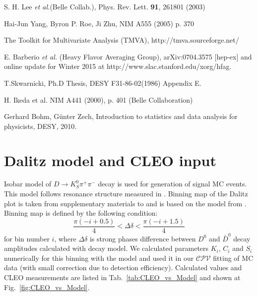 \documentclass[preprint,aps,showpacs]{revtex4}
\newcommand{\cpvconj}{\ensuremath{\mathcal{CPV}}\xspace}
\newcommand{\dkpp}{\ensuremath{D\to K^0_S\pi^+\pi^-}\xspace}
\begin{document}
\begin{thebibliography}{99}
S. H. Lee {\it et al.}(Belle Collab.), Phys. Rev. Lett. {\bf 91},
261801 (2003)

Hai-Jun Yang, Byron P. Roe, Ji Zhu, NIM A555 (2005) p. 370

The Toolkit for Multivariate Analysis (TMVA), 
http://tmva.sourceforge.net/

 E. Barberio {\it et al.} (Heavy Flavor Averaging Group), 
 arXiv:0704.3575 [hep-ex] and online update for Winter 2015 at 
 http://www.slac.stanford.edu/xorg/hfag.

% 

T.Skwarnicki, Ph.D Thesis, DESY F31-86-02(1986) Appendix E.

H. Ikeda et al. NIM A441 (2000), p. 401 (Belle Collaboration)

Gerhard Bohm, Günter Zech, Introduction to statistics and data analysis for physicists, DESY, 2010.

\end{thebibliography}

\appendix
\newpage
\section{Dalitz model and CLEO input}
Isobar model of \dkpp decay is used for generation of signal MC events. This model follows resonance structure measured in \cite{Belle_model}.
Binning map of the Dalitz plot is taken from supplementary materials to \cite{CLEO_phasees} and is based on the model from \cite{Belle_model}. Binning map is defined by the following condition:
\begin{equation}
\frac{\pi(-i+0.5)}{4}<\Delta\delta<\frac{\pi(-i+1.5)}{4}
\end{equation}
for bin number $i$, where $\Delta\delta$ is strong phases difference between $D^0$ and $\bar D^0$ decay amplitudes calculated with decay model. We calculated parameters $K_i$, $C_i$ and $S_i$ numerically for this binning with the model and used it in our \cpvconj fitting of MC data (with small correction due to detection efficiency). Calculated values and CLEO measurements are listed in Tab.~\ref{tab:CLEO_vs_Model} and shown at Fig.~\ref{fig:CLEO_vs_Model}.
\end{document}
